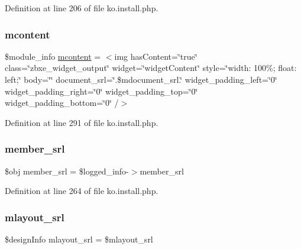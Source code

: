 Definition at line 206 of file ko.\+install.\+php.

\mbox{\label{ko_8install_8php_a9da4bb6e77356bb68ae0e05dbd9f5e2f}} 
\subsubsection{\texorpdfstring{mcontent}{mcontent}}
{\footnotesize\ttfamily \$module\+\_\+info \hyperlink{classmcontent}{mcontent} = \textquotesingle{}$<$img has\+Content=\char`\"{}true\char`\"{} class=\char`\"{}zbxe\+\_\+widget\+\_\+output\char`\"{} widget=\char`\"{}widget\+Content\char`\"{} style=\char`\"{}width\+: 100\%; float\+: left;\char`\"{} body=\char`\"{}\char`\"{} document\+\_\+srl=\char`\"{}\textquotesingle{}.\$mdocument\+\_\+srl.\textquotesingle{}\char`\"{} widget\+\_\+padding\+\_\+left=\char`\"{}0\char`\"{} widget\+\_\+padding\+\_\+right=\char`\"{}0\char`\"{} widget\+\_\+padding\+\_\+top=\char`\"{}0\char`\"{} widget\+\_\+padding\+\_\+bottom=\char`\"{}0\char`\"{} /$>$\textquotesingle{}}



Definition at line 291 of file ko.\+install.\+php.

\mbox{\label{ko_8install_8php_aa61f9e08f0fe505094d26f8143f30bbd}} 
\subsubsection{\texorpdfstring{member\+\_\+srl}{member\_srl}}
{\footnotesize\ttfamily \$obj member\+\_\+srl = \$logged\+\_\+info-\/$>$member\+\_\+srl}



Definition at line 264 of file ko.\+install.\+php.

\mbox{\label{ko_8install_8php_a9cf497537007b08c645bed35f564be54}} 
\subsubsection{\texorpdfstring{mlayout\+\_\+srl}{mlayout\_srl}}
{\footnotesize\ttfamily \$design\+Info mlayout\+\_\+srl = \$mlayout\+\_\+srl}



